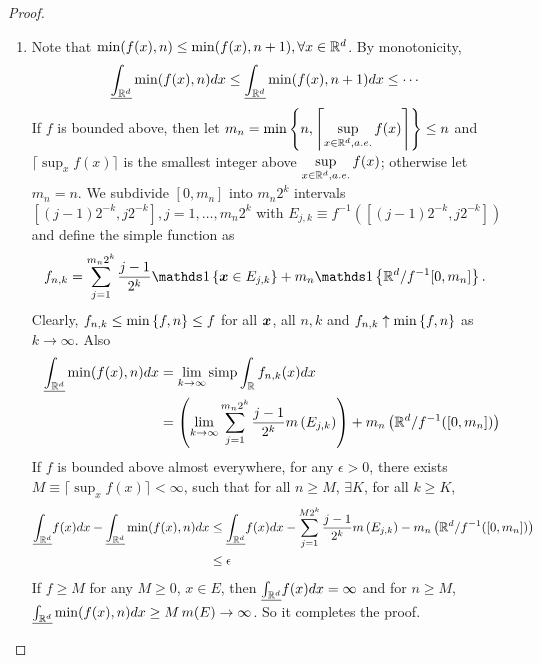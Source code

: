\documentclass[11pt]{article}
\begin{document}
\begin{itemize}
\begin{proof}
\begin{enumerate}
\item Note that $\min(f(x), n) \le \min(f(x), n+1), \forall x\in {\mathbb R}^{d}$. By monotonicity, 
\begin{align*}
\underline{\int_{{\mathbb R}^{d}}}\min(f(x), n)dx &\le \underline{\int_{{\mathbb R}^{d}}}\min(f(x), n+1)dx \le \cdots 
\end{align*} 
If $f$ is bounded above, then let $m_{n}= \min\left\{n, \left\lceil\sup\limits_{x\in {\mathbb R}^{d}, a.e.}f(x)\right\rceil\right\} \le n$ and $\lceil\sup_{x}f(x)\rceil $ is the smallest integer above $\sup\limits_{x\in {\mathbb R}^{d}, a.e.}f(x)$; otherwise let $m_{n}= n$. We subdivide $[0,m_{n}]$ into $m_{n}2^{k}$ intervals $[(j - 1)2^{-k}, j2^{-k}], j=1,\ldots, m_{n}2^{k}$ with $E_{j,k}\equiv  f^{-1}([(j - 1)2^{-k}, j2^{-k}])$ and define the simple function as 
\begin{align*}
f_{n,k} &= \sum_{j=1}^{m_{n}2^{k}}\frac{j-1}{2^{k}}\ind{\mb{x}\in E_{j,k}}+ m_{n}\ind{\bR^{d}/f^{-1}[0,m_{n}]}.
\end{align*}
Clearly, $f_{n,k}\le \min\left\{f, n\right\}\le f$ for all $\boldsymbol{x}$, all $n,k$ and $f_{n,k}\uparrow \min\left\{f, n\right\}$ as $k\rightarrow \infty$. Also
\begin{align*}
\underline{\int_{{\mathbb R}^{d}}}\min(f(x), n)dx&= \lim\limits_{k\rightarrow \infty}\text{simp}\int_{{\mathbb R}}f_{n,k}(x)dx\\
&=  \left(\lim\limits_{k\rightarrow \infty}\sum_{j=1}^{m_{n}2^{k}}\frac{j-1}{2^{k}}m\left(E_{j,k}\right)\right)+ m_{n}\left({\mathbb R}^{d}/f^{-1}([0,m_n])\right)
\end{align*}
If $f$ is bounded above almost everywhere, for any $\epsilon>0$, there exists $M\equiv \lceil\sup_{x}f(x)\rceil<\infty$, such that for all $n\ge M$, $\exists K$, for all $k\ge K$,  
\begin{align*}
\underline{\int_{{\mathbb R}^{d}}}f(x)dx - \underline{\int_{{\mathbb R}^{d}}}\min(f(x), n)dx  &\le  \underline{\int_{{\mathbb R}^{d}}}f(x)dx- \sum_{j=1}^{M2^{k}}\frac{j-1}{2^{k}}m\left(E_{j,k}\right)-m_{n}\left({\mathbb R}^{d}/f^{-1}([0,m_n])\right)\\
&\le \epsilon
\end{align*}
If $f\ge M$ for any $M\ge 0$, $x\in E$, then $\underline{\int_{{\mathbb R}^{d}}}f(x)dx=\infty$ and for $n\ge M$, $\underline{\int_{{\mathbb R}^{d}}}\min(f(x), n)dx \ge M\,m(E) \rightarrow \infty$. So it completes the proof. 


\end{enumerate}
\end{proof}
\end{itemize}
\end{document}

